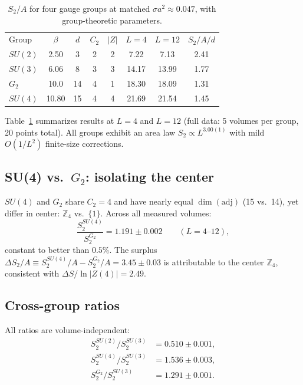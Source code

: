 \documentclass[twocolumn,prl,nofootinbib,superscriptaddress]{revtex4-2}
\begin{document}
\begin{table}[t]
\caption{$S_2/A$ for four gauge groups at matched $\sigma a^2 \approx 0.047$, with group-theoretic parameters.}
\label{tab:4groups}
\begin{ruledtabular}
\begin{tabular}{lccccccc}
\textrm{Group} & $\beta$ & $d$ & $C_2$ & $|Z|$ & \multicolumn{1}{c}{$L\!=\!4$} & \multicolumn{1}{c}{$L\!=\!12$} & $S_2\!/\!A\!/\!d$ \\
\colrule
$SU(2)$ & 2.50 & 3 & 2 & 2 & 7.22 & 7.13 & 2.41 \\
$SU(3)$ & 6.06 & 8 & 3 & 3 & 14.17 & 13.99 & 1.77 \\
$G_2$   & 10.0 & 14 & 4 & 1 & 18.30 & 18.09 & 1.31 \\
$SU(4)$ & 10.80 & 15 & 4 & 4 & 21.69 & 21.54 & 1.45 \\
\end{tabular}
\end{ruledtabular}
\end{table}

Table~\ref{tab:4groups} summarizes results at $L = 4$ and $L = 12$ (full data: 5 volumes per group, 20 points total).  All groups exhibit an area law $S_2 \propto L^{3.00(1)}$ with mild $O(1/L^2)$ finite-size corrections.

\subsection{SU(4) vs.\ $G_2$: isolating the center}

$SU(4)$ and $G_2$ share $C_2 = 4$ and have nearly equal $\dim(\mathrm{adj})$ (15 vs.\ 14), yet differ in center: $\mathbb{Z}_4$ vs.\ $\{1\}$.  Across all measured volumes:
\begin{equation}
\frac{S_2^{SU(4)}}{S_2^{G_2}} = 1.191 \pm 0.002 \qquad (L = 4\text{--}12),
\end{equation}
constant to better than $0.5\%$.  The surplus $\Delta S_2/A \equiv S_2^{SU(4)}/A - S_2^{G_2}/A = 3.45 \pm 0.03$ is attributable to the center $\mathbb{Z}_4$, consistent with $\Delta S / \ln|Z(4)| = 2.49$.

\subsection{Cross-group ratios}

All ratios are volume-independent:
\begin{align}
S_2^{SU(2)}/S_2^{SU(3)} &= 0.510 \pm 0.001, \\
S_2^{SU(4)}/S_2^{SU(3)} &= 1.536 \pm 0.003, \\
S_2^{G_2}/S_2^{SU(3)} &= 1.291 \pm 0.001.
\end{align}
\end{document}
